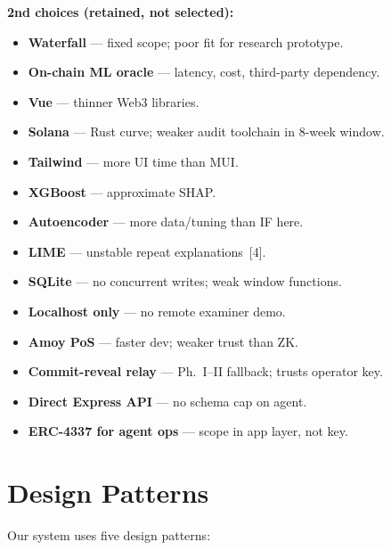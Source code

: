 \documentclass[12pt, a4paper]{report}
\begin{document}
\textbf{2nd choices (retained, not selected):}
\begin{itemize}[noitemsep]
\item \textbf{Waterfall} --- fixed scope; poor fit for research prototype.
\item \textbf{On-chain ML oracle} --- latency, cost, third-party dependency.
\item \textbf{Vue} --- thinner Web3 libraries.
\item \textbf{Solana} --- Rust curve; weaker audit toolchain in 8-week window.
\item \textbf{Tailwind} --- more UI time than MUI.
\item \textbf{XGBoost} --- approximate SHAP.
\item \textbf{Autoencoder} --- more data/tuning than IF here.
\item \textbf{LIME} --- unstable repeat explanations~[4].
\item \textbf{SQLite} --- no concurrent writes; weak window functions.
\item \textbf{Localhost only} --- no remote examiner demo.
\item \textbf{Amoy PoS} --- faster dev; weaker trust than ZK.
\item \textbf{Commit-reveal relay} --- Ph.~I--II fallback; trusts operator key.
\item \textbf{Direct Express API} --- no schema cap on agent.
\item \textbf{ERC-4337 for agent ops} --- scope in app layer, not key.
\end{itemize}

\section{Design Patterns}

Our system uses five design patterns:
\end{document}
